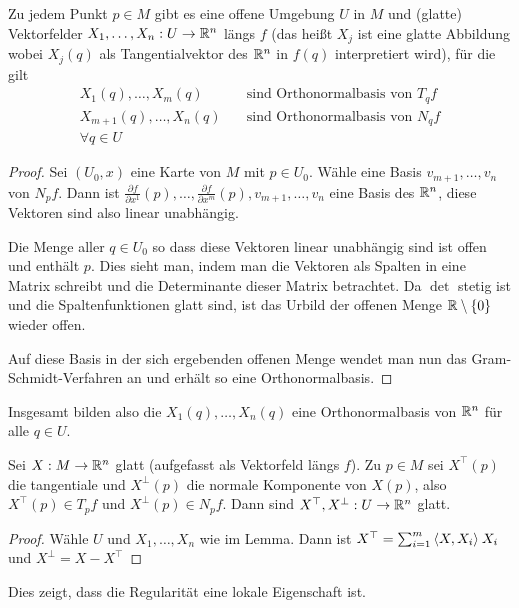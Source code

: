 \documentclass{skript}
\begin{document}
\begin{lem}
  Zu jedem Punkt $p\in M$ gibt es eine offene Umgebung $U$ in $M$ und (glatte)
  Vektorfelder $X_1, \dots, X_n : U\to \mathbb{R}^n$ längs $f$ (das heißt $X_j$ ist eine
  glatte Abbildung wobei $X_j(q)$ als Tangentialvektor des $\mathbb{R}^n$ in $f(q)$
  interpretiert wird), für die gilt
  \begin{align*}
    X_1(q), \dots, X_m(q) \quad & \text{sind Orthonormalbasis von } T_qf \\
    X_{m+1}(q), \dots, X_n(q) \quad & \text{sind Orthonormalbasis von } N_qf \\
    \forall q\in U
  \end{align*}
  \begin{proof}
    Sei $(U_0, x)$ eine Karte von $M$ mit $p\in U_0$. Wähle eine Basis
    $v_{m+1},\dots,v_n$ von $N_pf$. Dann ist $\frac{\partial f}{\partial
    x^1}(p),\dots,\frac{\partial f}{\partial x^m}(p), v_{m+1},\dots,v_n$ eine
    Basis des $\mathbb{R}^n$, diese Vektoren sind also linear unabhängig.


    Die Menge aller $q\in U_0$ so dass diese Vektoren linear unabhängig sind ist
    offen und enthält $p$. Dies sieht man, indem man die Vektoren als Spalten in
    eine Matrix schreibt und die Determinante dieser Matrix betrachtet. Da
    $\operatorname{det}$ stetig ist und die Spaltenfunktionen glatt sind, ist
    das Urbild der offenen Menge $\R\setminus\mdef{0}$ wieder offen.

    Auf diese Basis in der sich ergebenden offenen Menge wendet man nun das
    Gram-Schmidt-Verfahren an und erhält so eine Orthonormalbasis.
  \end{proof}
  Insgesamt bilden also die $X_1(q),\dots, X_n(q)$ eine Orthonormalbasis von
  $\mathbb{R}^n$ für alle $q\in U$.

  \begin{krl}
    Sei $X:M\to \mathbb{R}^n$ glatt (aufgefasst als Vektorfeld längs $f$). Zu $p\in M$
    sei $X^\top(p)$ die tangentiale und $X^\perp(p)$ die normale Komponente
    von $X(p)$, also $X^\top(p)\in T_pf$ und $X^\perp(p)\in N_pf$. Dann
    sind $X^\top,X^\perp: U\to\mathbb{R}^n$ glatt.

    \begin{proof}
      Wähle $U$ und $X_1,\dots,X_n$ wie im Lemma. Dann ist
      $X^\top=\sum_{i=1}^m\sprod{X,X_i}X_i$ und $X^\perp = X- X^\top$      
    \end{proof}
    Dies zeigt, dass die Regularität eine lokale Eigenschaft ist.
  \end{krl}
\end{lem}
\end{document}
